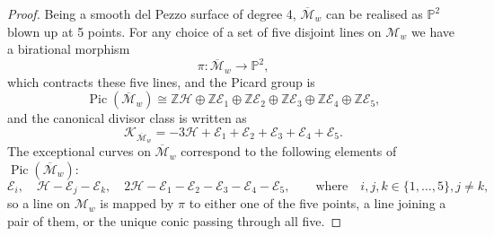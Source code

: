 \documentclass[a4paper,reqno]{amsart}
\numberwithin{equation}{section}
\newcommand{\Z}{\mathbb{Z}}
\newcommand{\p}{\mathbb{P}}
\newcommand{\E}{\mathcal{E}}
\newcommand{\Pic}{\operatorname{Pic}}
\numberwithin{equation}{section}
\begin{document}
\begin{proof}
Being a smooth del Pezzo surface of degree 4, $\overline{\mathcal{M}}_w$ can be realised as $\p^2$ blown up at 5 points.
    For any choice of a set of five disjoint lines on $\mathcal{M}_w$ we have a birational morphism 
    $$\pi : \overline{\mathcal{M}}_w \to \p^2,$$
    which contracts these five lines, and the Picard group is 
    $$\Pic(\overline{\mathcal{M}}_w)\cong \Z\mathcal{H}\oplus \Z \mathcal{E}_1\oplus\Z\mathcal{E}_2\oplus \Z \mathcal{E}_3\oplus \Z \mathcal{E}_4\oplus \Z \mathcal{E}_5,$$
    and the canonical divisor class is written as 
    $$\mathcal{K}_{\overline{\mathcal{M}}_w} = -3 \mathcal{H}+\mathcal{E}_1+\mathcal{E}_2+\mathcal{E}_3+\mathcal{E}_4 + \mathcal{E}_5.$$
    The exceptional curves on $\overline{\mathcal{M}}_{w}$ correspond to the following elements of $\Pic(\overline{\mathcal{M}}_w)$:
    $$\mathcal{E}_i,\quad \mathcal{H}-\mathcal{E}_j-\mathcal{E}_k, \quad 2 \mathcal{H}-\E_1-\E_2-\E_3-\E_4-\mathcal{E}_5, \qquad \text{where} \quad i,j,k\in \{1,\dots,5\}, j\neq k,$$
    so a line on $\mathcal{M}_w$ is mapped by $\pi$ to either one of the five points, a line joining a pair of them, or the unique conic passing through all five.


\end{proof}
\end{document}
